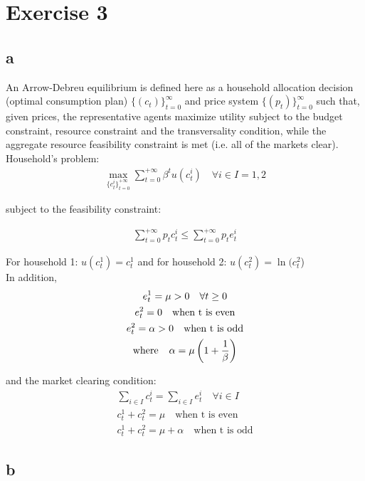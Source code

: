 \documentclass{article}
\begin{document}
\section{Exercise 3}
\subsection{a}

An Arrow-Debreu equilibrium is defined here as a household allocation decision (optimal consumption plan) $\{(c_t)\}^\infty_{t=0}$ and price system $\{(p_t)\}^\infty_{t=0}$ such that, given prices, the representative agents maximize utility subject to the budget constraint, resource constraint and the transversality condition, while the aggregate resource feasibility constraint is met (i.e. all of the markets clear).\\


Household's problem:
\begin{gather*}
    \max_{\{c_t^i\}^{+\infty}_{t=0}}\sum_{t=0}^{+\infty}\beta^tu(c_t^i)\quad\forall i\in I={1,2}
\end{gather*}

subject to the feasibility constraint:

\begin{gather*}
    \sum_{t=0}^{+\infty}p_tc_t^i\leq\sum_{t=0}^{+\infty}p_te_t^i
\end{gather*}

For household 1: $u(c_t^1)=c_t^1$ and for household 2: $u(c_t^2)=\ln(c_t^2$)\\

In addition,
\begin{gather*}
    e_t^1=\mu>0\quad\forall t\geq 0 \\
    e_t^2=0 \quad\mbox{when t is even}\\
    e_t^2=\alpha>0\quad\mbox{when t is odd}\\
    \mbox{where \hspace{0.1in}} \alpha=\mu\left(1+\frac{1}{\beta}\right)
\end{gather*}

and the market clearing condition:
\begin{gather*}
    \sum_{i\in I}c_t^i=\sum_{i\in I}e_t^i\quad\forall i\in I \\
    c_t^1+c_t^2=\mu\quad\mbox{when t is even}\\
        c_t^1+c_t^2=\mu+\alpha\quad\mbox{when t is odd}
\end{gather*}

\subsection{b}
\end{document}
